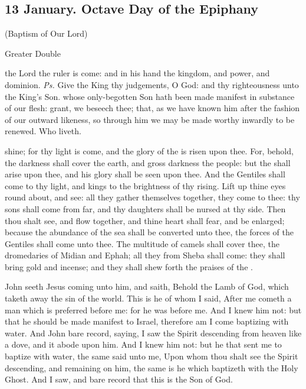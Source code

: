 \clearpage
\subsection{13 January. Octave Day of the Epiphany}

\centerline{\small{(Baptism of Our Lord)}}

\begin{inhead}
{Greater Double}
\end{inhead}


\introit
{} the Lord the ruler is come: and in his hand the kingdom, and power, and dominion. \textit{Ps.} Give the King thy judgements, O God: and thy righteousness unto the King's Son.
\collect
{} whose only-begotten Son hath been made manifest in substance of our flesh: grant, we beseech thee; that, as we have known him after the fashion of our outward likeness, so through him we may be made worthy inwardly to be renewed. Who liveth.

 shine; for thy light is come, and the glory of the  is risen upon thee. For, behold, the darkness shall cover the earth, and gross darkness the people: but the  shall arise upon thee, and his glory shall be seen upon thee. And the Gentiles shall come to thy light, and kings to the brightness of thy rising. Lift up thine eyes round about, and see: all they gather themselves together, they come to thee: thy sons shall come from far, and thy daughters shall be nursed at thy side. Then thou shalt see, and flow together, and thine heart shall fear, and be enlarged; because the abundance of the sea shall be converted unto thee, the forces of the Gentiles shall come unto thee. The multitude of camels shall cover thee, the dromedaries of Midian and Ephah; all they from Sheba shall come: they shall bring gold and incense; and they shall shew forth the praises of the .


 John seeth Jesus coming unto him, and saith, Behold the Lamb of God, which taketh away the sin of the world. This is he of whom I said, After me cometh a man which is preferred before me: for he was before me. And I knew him not: but that he should be made manifest to Israel, therefore am I come baptizing with water. And John bare record, saying, I saw the Spirit descending from heaven like a dove, and it abode upon him. And I knew him not: but he that sent me to baptize with water, the same said unto me, Upon whom thou shalt see the Spirit descending, and remaining on him, the same is he which baptizeth with the Holy Ghost. And I saw, and bare record that this is the Son of God.

